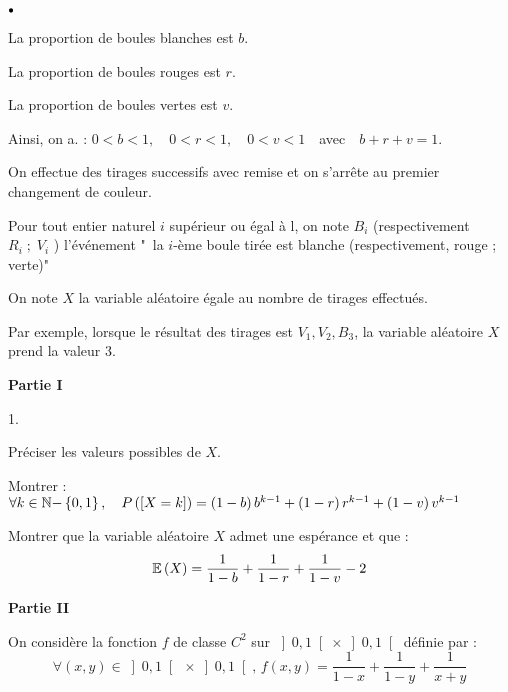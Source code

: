 \documentclass[11pt]{article}%
\begin{document}
\begin{noliste}{$\scriptstyle \bullet$}
\item La proportion de boules blanches est $b$.

\item La proportion de boules rouges est $r$.

\item La proportion de boules vertes est $v$.
\end{noliste}

Ainsi, on a. : $0<b<1,\quad 0<r<1,\quad 0<v<1\quad $avec$\quad b + r +
v = 1$.

On effectue des tirages successifs avec remise et on s'arrête au
premier
changement de couleur.

Pour tout entier naturel $i$ supérieur ou égal à l, on note $B_{i}$
(respectivement $R_{i}\;;\;V_{i}$ ) l'événement "\ la $i$-ème boule
tirée est blanche (respectivement, rouge ; verte)"

On note $X$ la variable aléatoire égale au nombre de tirages effectués.

Par exemple, lorsque le résultat des tirages est $V_{1},V_{2},B_{3}$,
la
variable aléatoire $X$ prend la valeur 3.

\begin{center}
\textbf{Partie I}
\end{center}

\begin{noliste}{1.}
 \setlength{\itemsep}{4mm}
\item Préciser les valeurs possibles de $X$.

\item Montrer : $\forall k\in \mathbb{N-}\left\{ 0,1\right\},\quad
P\left(\left[ {
X = k} \right]\right) = \left( 1-b\right) b^{k-1} + \left( 1-r\right) r^{k-1} +
\left(
1-v\right) v^{k-1}$

\item Montrer que la variable aléatoire $X$ admet une espérance et
que : 
\[
\mathbb{E}\left( X\right) = \frac{1}{1-b} + \frac{1}{1-r} + \frac{1}{1-v}-2 
\]
\end{noliste}

\begin{center}
\textbf{Partie II}
\end{center}

On considère la fonction $f$ de classe $C^{2}$ sur $\left] 0,1\right[
\times \left] 0,1\right[ $ définie par : 
\[
\forall \left( x,y\right) \in \left] 0,1\right[ \ \times \left]
0,1\right[,\,f\left( x,y\right) = \frac{1}{1-x} + \frac{1}{1-y} +
\frac{1}{x + y} 
\]
\end{document}
